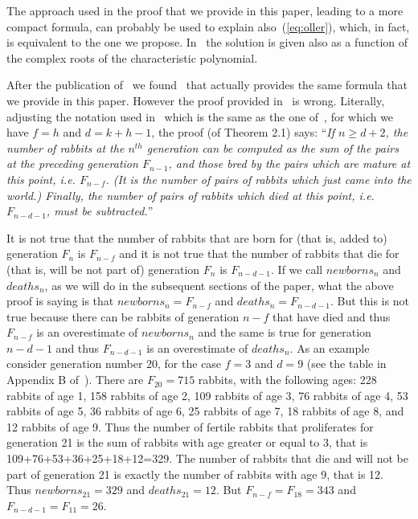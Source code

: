 \documentclass[11pt,epsf]{article}
\begin{document}
The approach used in the proof that 
we provide in this paper, leading to a more compact formula, can probably be used to explain also~(\ref{eq:oller}),
which, in fact, is equivalent to the one we propose. 
In~\cite{O2009} the solution is given also
as a function of the complex roots of the characteristic polynomial.

After the publication of~\cite{D2025} we found~\cite{F2011} that actually provides the same formula that we provide in this paper.
However the proof provided in~\cite{F2011} is wrong. Literally, adjusting the notation used in~\cite{F2011} which is the same
as the one of~\cite{O2009}, for which we have $f=h$ and $d=k+h-1$, the proof (of Theorem 2.1) says:
``{\em If $n\ge d+2$, the number of rabbits at the $n^{th}$ generation can be computed as the sum of
the pairs at the preceding generation $F_{n-1}$, and those bred by the pairs which are mature at this
point, i.e. $F_{n-f}$. (It is the number of pairs of rabbits which just came into the world.) Finally,
the number of pairs of rabbits which died at this point, i.e. $F_{n-d-1}$, must be subtracted.}''

It is not true that the number of rabbits that are born for (that is, added to) generation $F_n$ is $F_{n-f}$ and
it is not true that the number of rabbits that die for (that is, will be not part of) generation $F_n$ is $F_{n-d-1}$.
If we call $newborns_n$ and $deaths_n$, as we will do in the subsequent sections of  the paper, what the above proof is saying is that
$newborns_n=F_{n-f}$ and $deaths_n=F_{n-d-1}$. But this is not true because there can be rabbits of generation $n-f$ that have died and thus
$F_{n-f}$ is an overestimate of $newborns_n$ and 
the same is true for generation $n-d-1$ and thus $F_{n-d-1}$ is an overestimate of $deaths_n$. As an example consider
generation number 20, for the case $f=3$ and $d=9$ (see the table in Appendix B of~\cite{D2025}).
There are $F_{20}=715$ rabbits, with the following ages: 
228 rabbits of age 1,
158 rabbits of age 2,
109 rabbits of age 3,
76 rabbits of age 4,
53 rabbits of age 5,
36 rabbits of age 6,
25 rabbits of age 7,
18 rabbits of age 8, and
12 rabbits of age 9.
Thus the number of fertile rabbits that proliferates for generation 21 is the sum of rabbits with
age greater or equal to 3, that is 109+76+53+36+25+18+12=329.
The number of rabbits that die and will not be part of generation 21 is exactly the number of
rabbits with age 9, that is 12.
Thus $newborns_{21}=329$ and $deaths_{21}=12$. But $F_{n-f}=F_{18}=343$ and $F_{n-d-1}=F_{11}=26$.
\end{document}
